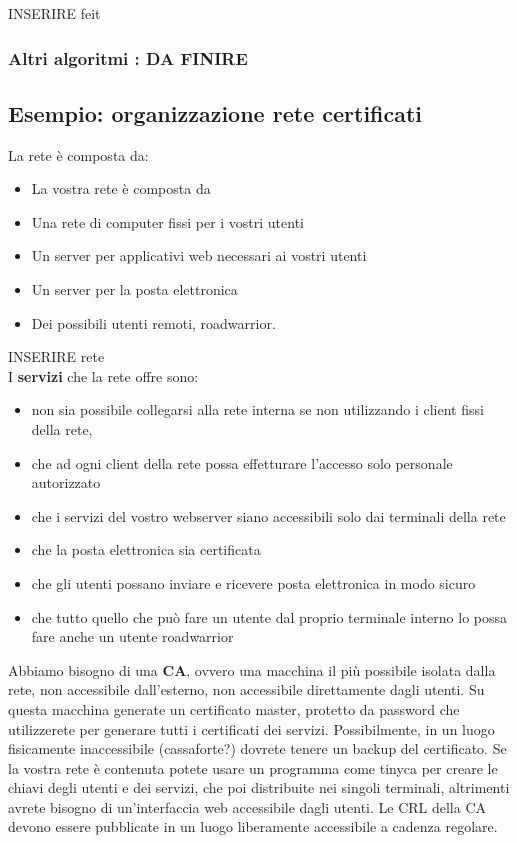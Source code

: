 \documentclass[12pt]{article}
\begin{document}
				INSERIRE feit\\
			
			\subsubsection{Altri algoritmi : DA FINIRE}
			
		\subsection{Esempio: organizzazione rete certificati}
			La rete è composta da:
			\begin{itemize}
				\item La vostra rete è composta da
				\item Una rete di computer fissi per i vostri utenti
				\item Un server per applicativi web necessari ai vostri utenti
				\item Un server per la posta elettronica
				\item Dei possibili utenti remoti, roadwarrior.
			\end{itemize}
	
			INSERIRE rete\\
		
			I \textbf{servizi} che la rete offre sono:
			\begin{itemize}
				\item non sia possibile collegarsi alla rete interna se non utilizzando i client fissi
				della rete,
				\item che ad ogni client della rete possa effetturare l’accesso solo personale
				autorizzato
				\item che i servizi del vostro webserver siano accessibili solo dai terminali della
				rete
				\item che la posta elettronica sia certificata
				\item che gli utenti possano inviare e ricevere posta elettronica in modo sicuro
				\item che tutto quello che può fare un utente dal proprio terminale interno lo
				possa fare anche un utente roadwarrior
			\end{itemize} 
			Abbiamo bisogno di una \textbf{CA}, ovvero una macchina il più possibile isolata dalla rete, non accessibile
			dall’esterno, non accessibile direttamente dagli utenti.
			Su questa macchina generate un certificato master, protetto da password
			che utilizzerete per generare tutti i certificati dei servizi. Possibilmente, in
			un luogo fisicamente inaccessibile (cassaforte?) dovrete tenere un
			backup del certificato.
			Se la vostra rete è contenuta potete usare un programma come tinyca
			per creare le chiavi degli utenti e dei servizi, che poi distribuite nei singoli
			terminali, altrimenti avrete bisogno di un’interfaccia web accessibile dagli
			utenti.
			Le CRL della CA devono essere pubblicate in un luogo liberamente
			accessibile a cadenza regolare.
			
\end{document}
